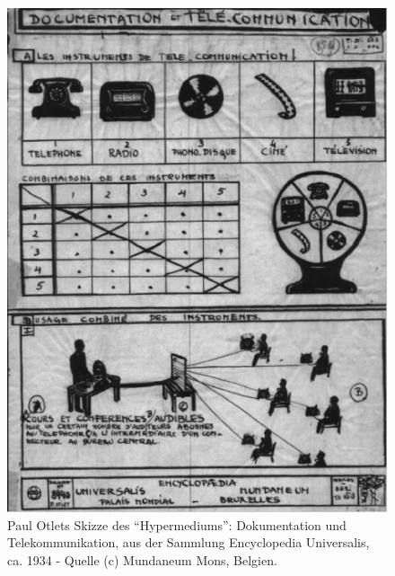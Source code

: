 \begin{figure}[htbp]
\centering
\includegraphics{img/Mundaneum3.jpg}
\caption{Paul Otlets Skizze des \enquote{Hypermediums}: Dokumentation
und Telekommunikation, aus der Sammlung Encyclopedia Universalis, ca.
1934 - Quelle (c) Mundaneum Mons, Belgien.}
\end{figure}

